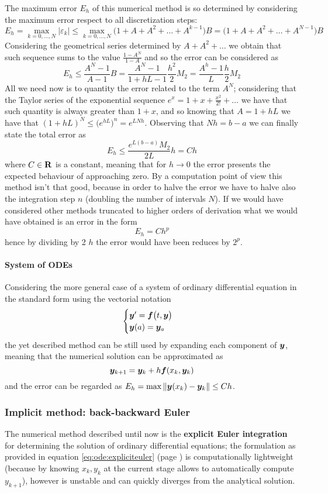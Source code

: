 	The maximum error $E_h$ of this numerical method is so determined by considering the maximum error respect to all discretization steps:
	\[ E_h = \max_{k=0,\dots,N} |\varepsilon_k| \leq \max_{k=0,\dots,N} \big(1 + A + A^2 + \dots + A^{k-1}\big) B = \big(1 + A + A^2 + \dots + A^{N-1}\big) B\]
	Considering the geometrical series determined by $A+ A^2+\dots$ we obtain that such sequence sums to the value $\frac{1-A^N}{1-A}$ and so the error can be considered as
	\[ E_h \leq \frac{A^N-1}{A-1} B = \frac{A^N - 1}{1+hL - 1} \frac{h^2}{2}M_2 = \frac{A^h - 1}{L} \frac{h}2 M_2 \]
	All we need now is to quantity the error related to the  term $A^N$; considering that the Taylor series of the exponential sequence $e^x = 1 + x + \frac{x^2}{2!}+\dots$ we have that such quantity is always greater than $1+x$, and so knowing that $A= 1+hL$ we have that $(1+hL)^N \leq \big(e^{hL}\big)^n = e^{LNh}$. Observing that $Nh=b-a$ we can finally state the total error as
	\begin{equation}
		E_h\leq \frac{e^{L(b-a)} M_2}{2L} h = Ch
	\end{equation}
	where $C\in \mathbf{R}$ is a constant, meaning that for $h\rightarrow 0$ the error presents the expected behaviour of approaching zero. By a computation point of view this method isn't that good, because in order to halve the error we have to halve also the integration step $n$ (doubling the number of intervals $N$). If we would have considered other methods truncated to higher orders of derivation what we would have obtained is an error in the form
	\[ E_h = C h^p \]
	hence by dividing by 2 $h$ the error would have been reduces by $2^p$.
	
	\paragraph{System of ODEs} Considering the more general case of a system of ordinary differential equation in the standard form using the vectorial notation
	\[ \begin{cases}
		\boldsymbol{y}' = \boldsymbol{f}\big(t,\boldsymbol{y}\big) \\ \boldsymbol{y}(a) = \boldsymbol{y}_a
	\end{cases} \]	
	the yet described method can be still used by expanding each component of $\boldsymbol{y}$, meaning that the numerical solution can be approximated as
	\[ \boldsymbol{y}_{k+1} = \boldsymbol{y}_k + h \boldsymbol{f}(x_k, \boldsymbol{y}_k) \]
	and the error can be regarded as $E_h = \max \|\boldsymbol{y}(x_k) - \boldsymbol{y}_k\| \leq Ch$.
	
	\subsubsection{Implicit method: back-backward Euler }
		The numerical method described until now is the \textbf{explicit Euler integration} for determining the solution of ordinary differential equations; the formulation as provided in equation \ref{eq:ode:expliciteuler} (page \pageref{eq:ode:expliciteuler}) is computationally lightweight (because by knowing $x_k,y_k$ at the current stage allows to automatically compute $y_{k+1}$), however is unstable and can quickly diverges from the analytical solution.
		
